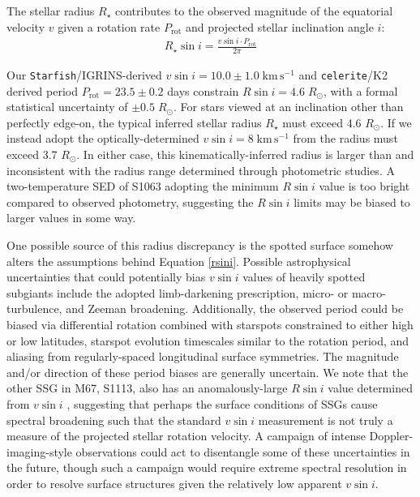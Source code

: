 \documentclass[twocolumn,tighten]{aastex631}
\begin{document}
The stellar radius $R_{\star}$ contributes to the observed magnitude of the equatorial velocity $v$ given a rotation rate $P_{\mathrm{rot}}$ and projected stellar inclination angle $i$:
\begin{eqnarray} 
  R_{\star} \sin{i} = \frac{v \sin{i} \cdot P_{\mathrm{rot}}}{2 \pi} \label{rsini}
\end{eqnarray}

Our \texttt{Starfish}/IGRINS-derived $v\sin{i}=10.0 \pm 1.0 \; \mathrm{km\,s^{-1}}$ and \texttt{celerite}/K2 derived period $P_{\mathrm{rot}}=23.5 \pm 0.2$ days constrain $R\sin{i} = 4.6 \;R_\odot$, with a formal statistical uncertainty of $\pm 0.5 \;R_\odot$.  For stars viewed at an inclination other than perfectly edge-on, the typical inferred stellar radius $R_{\star}$ must exceed 4.6 $R_{\odot}$. If we instead adopt the optically-determined $v\sin{i}=8\; \mathrm{km\,s^{-1}}$ from \citet{mathieu03} the radius must exceed 3.7 $R_{\odot}$. In either case, this kinematically-inferred radius is larger than and inconsistent with the radius range determined through photometric studies. A two-temperature SED of S1063 adopting the minimum $R\sin{i}$ value is too bright compared to observed photometry, suggesting the $R\sin{i}$ limits may be biased to larger values in some way.

One possible source of this radius discrepancy is the spotted surface somehow alters the assumptions behind Equation \ref{rsini}. Possible astrophysical uncertainties that could potentially bias $v\sin{i}$ values of heavily spotted subgiants include the adopted limb-darkening prescription, micro- or macro-turbulence, and Zeeman broadening. Additionally, the observed period could be biased via differential rotation combined with starspots constrained to either high or low latitudes, starspot evolution timescales similar to the rotation period, and aliasing from regularly-spaced longitudinal surface symmetries. The magnitude and/or direction of these period biases are generally uncertain. We note that the other SSG in M67, S1113, also has an anomalously-large $R\sin{i}$ value determined from $v\sin{i}$ \citep{mathieu03}, suggesting that perhaps the surface conditions of SSGs cause spectral broadening such that the standard $v\sin{i}$ measurement is not truly a measure of the projected stellar rotation velocity. A campaign of intense Doppler-imaging-style observations could act to disentangle some of these uncertainties in the future, though such a campaign would require extreme spectral resolution in order to resolve surface structures given the relatively low apparent $v\sin{i}$.
\end{document}
